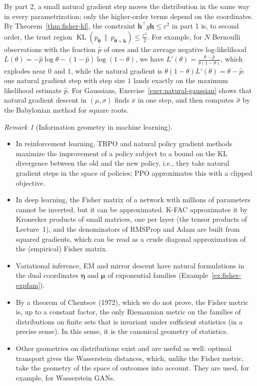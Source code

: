 \documentclass[11pt]{article}
\theoremstyle{definition}
\theoremstyle{plain}
\theoremstyle{remark}
\newtheorem{remark}[definition]{Remark}
\DeclareMathOperator{\KL}{KL}
\begin{document}
By part 2, a small natural gradient step moves the distribution in the same way in every parametrization; only the higher-order terms depend on the coordinates. By Theorem~\ref{thm:fisher-kl}, the constraint $\mathbf{h}^\top g\mathbf{h} \leq \varepsilon^2$ in part 1 is, to second order, the trust region $\KL(p_{\boldsymbol{\theta}} \,\|\, p_{\boldsymbol{\theta} + \mathbf{h}}) \leq \frac{\varepsilon^2}{2}$. For example, for $N$ Bernoulli observations with the fraction $\hat p$ of ones and the average negative log-likelihood $L(\theta) = -\hat p\log\theta - (1 - \hat p)\log(1 - \theta)$, we have $L'(\theta) = \frac{\theta - \hat p}{\theta(1 - \theta)}$, which explodes near $0$ and $1$, while the natural gradient is $\theta(1 - \theta)L'(\theta) = \theta - \hat p$: one natural gradient step with step size $1$ lands exactly on the maximum likelihood estimate $\hat p$. For Gaussians, Exercise~\ref{exer:natural-gaussian} shows that natural gradient descent in $(\mu, \sigma)$ finds $\bar x$ in one step, and then computes $\hat\sigma$ by the Babylonian method for square roots.

\begin{remark}[Information geometry in machine learning]
    \begin{itemize}
        \item In reinforcement learning, TRPO and natural policy gradient methods maximize the improvement of a policy subject to a bound on the KL divergence between the old and the new policy, i.e., they take natural gradient steps in the space of policies; PPO approximates this with a clipped objective.
        \item In deep learning, the Fisher matrix of a network with millions of parameters cannot be inverted, but it can be approximated. K-FAC approximates it by Kronecker products of small matrices, one per layer (the tensor products of Lecture~1), and the denominators of RMSProp and Adam are built from squared gradients, which can be read as a crude diagonal approximation of the (empirical) Fisher matrix.
        \item Variational inference, EM and mirror descent have natural formulations in the dual coordinates $\boldsymbol{\eta}$ and $\boldsymbol{\mu}$ of exponential families (Example~\ref{ex:fisher-expfam}).
        \item By a theorem of Chentsov (1972), which we do not prove, the Fisher metric is, up to a constant factor, the only Riemannian metric on the families of distributions on finite sets that is invariant under sufficient statistics (in a precise sense). In this sense, it is the canonical geometry of statistics.
        \item Other geometries on distributions exist and are useful as well: optimal transport gives the Wasserstein distances, which, unlike the Fisher metric, take the geometry of the space of outcomes into account. They are used, for example, for Wasserstein GANs.
    \end{itemize}
\end{remark}
\end{document}
